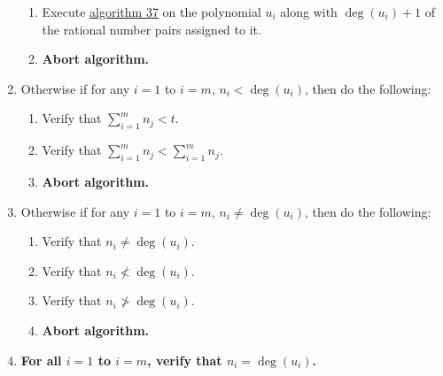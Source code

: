 \documentclass[twocolumn]{article}
\begin{document}
\begin{enumerate}
				\begin{enumerate}
					\item Execute \hyperref[sec:algorithm 37]{algorithm 37} on the polynomial $u_i$ along with $\deg(u_i)+1$ of the rational number pairs assigned to it.
					\item \textbf{Abort algorithm.}
				\end{enumerate}
				\item Otherwise if for any $i=1$ to $i=m$, $n_i<\deg(u_i)$, then do the following:
				\begin{enumerate}
					\item Verify that $\sum_{i=1}^m n_j<t$.
					\item Verify that $\sum_{i=1}^m n_j<\sum_{i=1}^m n_j$.
					\item \textbf{Abort algorithm.}
				\end{enumerate}
				\item Otherwise if for any $i=1$ to $i=m$, $n_i\ne\deg(u_i)$, then do the following:
				\begin{enumerate}
					\item Verify that $n_i\ne\deg(u_i)$.
					\item Verify that $n_i\nless\deg(u_i)$.
					\item Verify that $n_i\ngtr\deg(u_i)$.
					\item \textbf{Abort algorithm.}
				\end{enumerate}
				\item \textbf{For all $i=1$ to $i=m$, verify that $n_i=\deg(u_i)$.}
			\end{enumerate}
\end{document}
